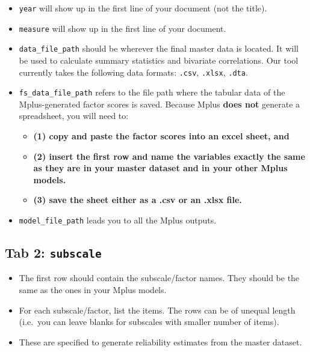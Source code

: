 \documentclass[
]{book}
\begin{document}
\begin{itemize}
\item
  \texttt{year} will show up in the first line of your document (not the title).
\item
  \texttt{measure} will show up in the first line of your document.
\item
  \texttt{data\_file\_path} should be wherever the final master data is located. It will be used to calculate summary statistics and bivariate correlations. Our tool currently takes the following data formats: \texttt{.csv}, \texttt{.xlsx}, \texttt{.dta}.
\item
  \texttt{fs\_data\_file\_path} refers to the file path where the tabular data of the Mplus-generated factor scores is saved. Because Mplus \textbf{does not} generate a spreadsheet, you will need to:

  \begin{itemize}
  \item
    \textbf{(1) copy and paste the factor scores into an excel sheet, and}
  \item
    \textbf{(2) insert the first row and name the variables exactly the same as they are in your master dataset and in your other Mplus models.}
  \item
    \textbf{(3) save the sheet either as a .csv or an .xlsx file.}
  \end{itemize}
\item
  \texttt{model\_file\_path} leads you to all the Mplus outputs.
\end{itemize}

\hypertarget{tab-2-subscale}{%
\subsection{\texorpdfstring{Tab 2: \texttt{subscale}}{Tab 2: subscale}}\label{tab-2-subscale}}

\begin{itemize}
\item
  The first row should contain the subscale/factor names. They should be the same as the ones in your Mplus models.
\item
  For each subscale/factor, list the items. The rows can be of unequal length (i.e.~you can leave blanks for subscales with smaller number of items).
\item
  These are specified to generate reliability estimates from the master dataset.
\end{itemize}
\end{document}
